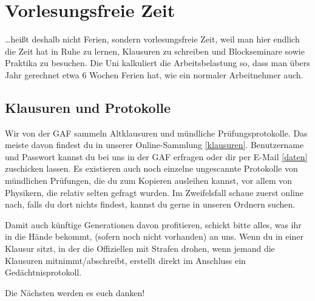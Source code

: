 ﻿\chapter{Vorlesungsfreie Zeit}

\ldots heißt deshalb nicht Ferien, sondern vorlesungsfreie Zeit, weil man hier
endlich die Zeit hat in Ruhe zu lernen, Klausuren zu schreiben und
Blockseminare sowie Praktika zu besuchen. Die Uni kalkuliert die
Arbeitsbelastung so, dass man übers Jahr gerechnet etwa 6 Wochen Ferien hat, wie
ein normaler Arbeitnehmer auch.

\section{Klausuren und Protokolle}
Wir von der GAF sammeln Altklausuren und mündliche Prüfungsprotokolle. Das
meiste davon findest du in unserer Online-Sammlung \ref{klausuren}.
Benutzername und Passwort kannst du bei uns in der GAF erfragen oder dir per
E-Mail \ref{daten} zuschicken lassen.  Es existieren auch noch einzelne
ungescannte Protokolle von mündlichen Prüfungen, die du zum Kopieren ausleihen
kannst, vor allem von Physikern, die relativ selten gefragt wurden. Im
Zweifelsfall schaue zuerst online nach, falls du dort nichts findest, kannst
du gerne in unseren Ordnern suchen.

Damit auch künftige Generationen davon profitieren, schickt bitte alles,
was ihr in die Hände bekommt, (sofern noch nicht vorhanden) an uns.
Wenn du in einer Klausur sitzt, in der die Offiziellen mit Strafen
drohen, wenn jemand die Klausuren mitnimmt/abschreibt, erstellt
direkt im Anschluss ein Gedächtnisprotokoll.

Die Nächsten werden es euch danken!

\begin{urlList}
\end{urlList}

